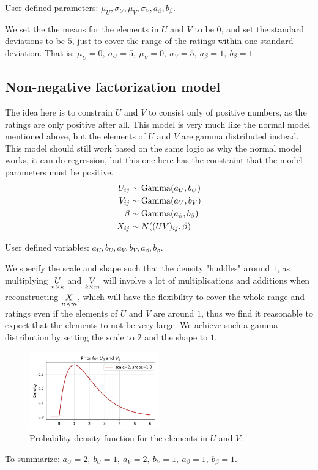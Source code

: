 \documentclass[12pt]{article}
\begin{document}
    User defined parameters: $\mu_U, \sigma_U, \mu_V, \sigma_V, a_\beta, b_\beta$.
    
    \vspace{3mm}
    We set the the means for the elements in $U$ and $V$ to be $0$, and set the standard deviations to be $5$, just to cover the range of the ratings within one standard deviation. That is: $\mu_U=0,\ \sigma_U=5,\ \mu_V=0,\ \sigma_V=5,\ a_\beta=1,\ b_\beta=1$.

    \subsection{Non-negative factorization model}
    The idea here is to constrain $U$ and $V$ to consist only of positive numbers, as the ratings are only positive after all. This model is very much like the normal model mentioned above, but the elements of $U$ and $V$ are gamma distributed instead. This model should still work based on the same logic as why the normal model works, it can do regression, but this one here has the constraint that the model parameters must be positive. 
    \begin{align*}
        U_{ij} &\sim \operatorname{Gamma}(a_U, b_U) \\
        V_{ij} &\sim \operatorname{Gamma}(a_V, b_V) \\
        \beta  &\sim \operatorname{Gamma}(a_\beta, b_\beta) \\
        X_{ij} &\sim N((UV)_{ij}, \beta) 
    \end{align*}

    User defined variables: $a_U, b_U, a_V, b_V, a_\beta, b_\beta$.
    
    \vspace{3mm}
    We specify the scale and shape such that the density "huddles" around $1$, as multiplying $\underset{n \times k}{U}$ and $\underset{k \times m}{V}$ will involve a lot of multiplications and additions when reconstructing $\underset{n \times m}{X}$, which will have the flexibility to cover the whole range and ratings even if the elements of $U$ and $V$ are around $1$, thus we find it reasonable to expect that the elements to not be very large. We achieve such a gamma distribution by setting the scale to $2$ and the shape to $1$.
    \begin{figure}[H]
        \centering
        \includegraphics[width=0.5\textwidth]{nmfprior.pdf}
        \caption{Probability density function for the elements in $U$ and $V$.}
    \end{figure}
    To summarize: $a_U=2,\ b_U=1,\ a_V=2,\ b_V=1,\ a_\beta=1,\ b_\beta=1$.
\end{document}
